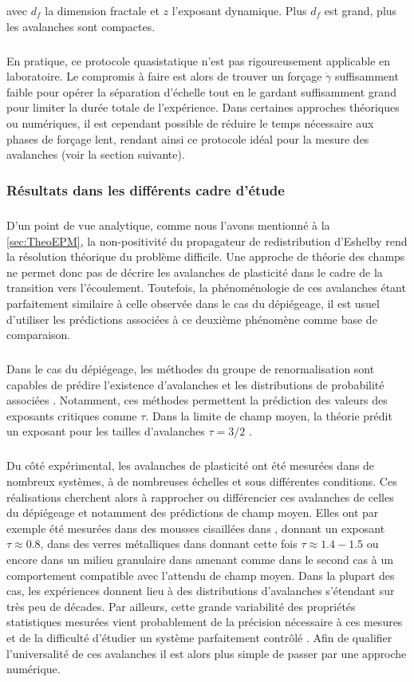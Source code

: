 \noindent avec $d_f$ la dimension fractale et $z$ l'exposant dynamique. Plus $d_f$ est grand, plus les avalanches sont compactes.

\subparagraph{}En pratique, ce protocole quasistatique n'est pas rigoureusement applicable en laboratoire. Le compromis à faire est alors de trouver un forçage $\dot{\gamma}$ suffisamment faible pour opérer la séparation d'échelle tout en le gardant suffisamment grand pour limiter la durée totale de l'expérience. Dans certaines approches théoriques ou numériques, il est cependant possible de réduire le temps nécessaire aux phases de forçage lent, rendant ainsi ce protocole idéal pour la mesure des avalanches (voir la section suivante).

\subsubsection{Résultats dans les différents cadre d'étude}

\subparagraph{}D'un point de vue analytique, comme nous l'avons mentionné à la \autoref{sec:TheoEPM}, la non-positivité du propagateur de redistribution d'Eshelby rend la résolution théorique du problème difficile. Une approche de théorie des champs ne permet donc pas de décrire les avalanches de plasticité dans le cadre de la transition vers l'écoulement. Toutefois, la phénoménologie de ces avalanches étant parfaitement similaire à celle observée dans le cas du dépiégeage, il est usuel d'utiliser les prédictions associées à ce deuxième phénomène comme base de comparaison.

\subparagraph{}Dans le cas du dépiégeage, les méthodes du groupe de renormalisation sont capables de prédire l'existence d'avalanches et les distributions de probabilité associées \cite{wiese_theory_2022}. Notamment, ces méthodes permettent la prédiction des valeurs des exposants critiques comme $\tau$. Dans la limite de champ moyen, la théorie prédit un exposant pour les tailles d'avalanches $\tau = 3/2$ \cite{le_doussal_size_2009}.

\subparagraph{}Du côté expérimental, les avalanches de plasticité ont été mesurées dans de nombreux systèmes, à de nombreuses échelles et sous différentes conditions. Ces réalisations cherchent alors à rapprocher ou différencier ces avalanches de celles du dépiégeage et notamment des prédictions de champ moyen. Elles ont par exemple été mesurées dans des mousses cisaillées  dans \cite{lauridsen_shear-induced_2002}, donnant un exposant $\tau\approx 0.8$, dans des verres métalliques dans \cite{sun_plasticity_2010} donnant cette fois $\tau\approx 1.4-1.5$ ou encore dans un milieu granulaire  dans \cite{denisov_universality_2016} amenant comme dans le second cas à un comportement compatible avec l'attendu de champ moyen. Dans la plupart des cas, les expériences donnent lieu à des distributions d'avalanches s'étendant sur très peu de décades. Par ailleurs, cette grande variabilité des propriétés statistiques mesurées vient probablement de la précision nécessaire à ces mesures et de la difficulté d'étudier un système parfaitement contrôlé \cite{bonn_yield_2017}. Afin de qualifier l'universalité de ces avalanches il est alors plus simple de passer par une approche numérique.

